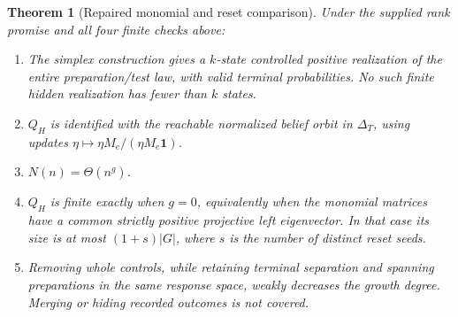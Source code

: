 \documentclass[11pt]{article}
\newtheorem{theorem}{Theorem}[section]
\theoremstyle{remark}
\newcommand{\one}{\mathbf 1}
\begin{document}
\begin{theorem}[Repaired monomial and reset comparison]
\label{thm:comparative}
Under the supplied rank promise and all four finite checks above:
\begin{enumerate}
\item The simplex construction gives a $k$-state controlled positive realization of the entire preparation/test law, with valid terminal probabilities. No such finite hidden realization has fewer than $k$ states.
\item $Q_H$ is identified with the reachable normalized belief orbit in $\Delta_T$, using updates $\eta\mapsto \eta M_e/(\eta M_e\one)$.
\item $N(n)=\Theta(n^g)$.
\item $Q_H$ is finite exactly when $g=0$, equivalently when the monomial matrices have a common strictly positive projective left eigenvector. In that case its size is at most $(1+s)|G|$, where $s$ is the number of distinct reset seeds.
\item Removing whole controls, while retaining terminal separation and spanning preparations in the same response space, weakly decreases the growth degree. Merging or hiding recorded outcomes is not covered.
\end{enumerate}
\end{theorem}
\end{document}
